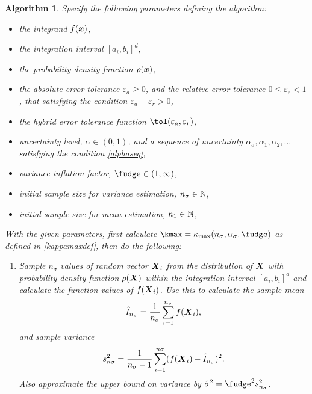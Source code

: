 \documentclass{iitthesis}
\newtheorem{algorithm}[theorem]{Algorithm}
\begin{document}
\begin{algorithm}\label{alg:cubMCg} 
Specify the following parameters defining the algorithm:
\begin{itemize}
\item the integrand $f(\boldsymbol{x})$,
\item the integration interval $[a_i,b_i]^d$,
\item the probability density function $\rho(\boldsymbol{x})$,
\item the absolute error tolerance $\varepsilon_a \geq 0$, and the relative error tolerance $0 \leq \varepsilon_r <1$, that satisfying the condition $\varepsilon_a+\varepsilon_r >0$,
\item the hybrid error tolerance function $\tol(\varepsilon_a,\varepsilon_r)$,
\item uncertainty level, $\alpha\in (0,1)$, and a sequence of uncertainty $ \alpha_\sigma, \alpha_1,  \alpha_2, \ldots$ satisfying the condition \eqref{alphaseq}, 
\item variance inflation factor, $\fudge \in (1,\infty)$, 
\item initial sample size for variance estimation, $n_{\sigma} \in \mathbb{N}$,
\item initial sample size for mean estimation, $n_1 \in \mathbb{N}$,
\end{itemize} 
With the given parameters, first calculate $\kmax=\kappa_{\max}(n_\sigma,\alpha_\sigma,\fudge)$ as defined in \eqref{kappamaxdef}, then do the following:
\begin{enumerate}
\item Sample $n_\sigma$ values of random vector $\boldsymbol{X}_i$ from the distribution of $\boldsymbol{X}$ with probability density function $\rho(\boldsymbol{X})$ within the integration interval $[a_i,b_i]^d$ and calculate the function values of $f(\boldsymbol{X}_i)$. Use this to calculate the sample mean $$\hat{I}_{n_\sigma} = \frac{1}{n_\sigma}\sum_{i=1}^{n_\sigma} f(\boldsymbol{X}_i),$$ and sample variance $$s_{n\sigma}^2 = \frac{1}{n_\sigma-1}\sum_{i=1}^{n\sigma} (f(\boldsymbol{X}_i)-\hat{I}_{n_\sigma})^2.$$ Also approximate the upper bound on variance by $\hsigma^2 = \fudge^2 s^2_{n_\sigma}$. 


\end{enumerate}
\end{algorithm}
\end{document}

